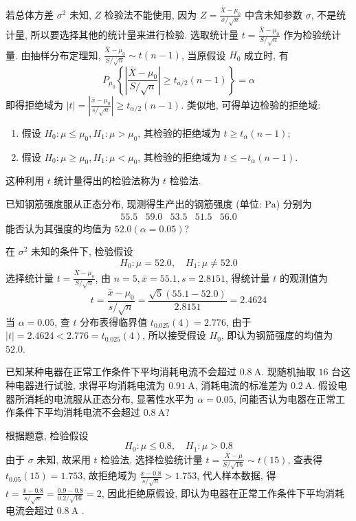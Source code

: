 若总体方差 $ \sigma^{2} $ 未知, $Z $ 检验法不能使用, 因为 $\displaystyle Z=\frac{\bar{X}-\mu_{0}}{\sigma / \sqrt{n}} $ 中含未知参数 $\sigma$, 不是统计量, 所以要选择其他的统计量来进行检验.
选取统计量 $\displaystyle t=\frac{\bar{X}-\mu_{0}}{S / \sqrt{n}} $ 作为检验统计量.
由抽样分布定理知, $\displaystyle\frac{\bar{X}-\mu_{0}}{S / \sqrt{n}} \sim t(n-1)$, 当原假设 $ H_{0} $ 成立时, 有
$$P_{\mu_{0}}\left\{\left|\frac{\bar{X}-\mu_{0}}{S / \sqrt{n}}\right| \geqslant t_{a / 2}(n-1)\right\}=\alpha$$
即得拒绝域为 $\displaystyle |t|=\left|\frac{\bar{x}-\mu_{0}}{s / \sqrt{n}}\right| \geqslant t_{\alpha / 2}(n-1)$.
类似地, 可得单边检验的拒绝域:
\begin{enumerate}[label=(\arabic{*})]
    \item 假设 $ H_{0}: \mu \leqslant \mu_{0}, H_{1}: \mu>\mu_{0}$, 其检验的拒绝域为 $ t \geqslant t_{\alpha}(n-1) $;
    \item 假设 $ H_{0}: \mu \geqslant \mu_{0}, H_{1}: \mu<\mu_{0}$, 其检验的拒绝域为 $ t \leqslant-t_{\alpha}(n-1) $.
\end{enumerate}
这种利用 $ t $ 统计量得出的检验法称为 $ t $ 检验法.

\begin{example}
    已知钢筋强度服从正态分布, 现测得生产出的钢筋强度 (单位: $ \mathrm{Pa} $) 分别为
    $$\begin{array}{lllll}
            55.5 & 59.0 & 53.5 & 51.5 & 56.0
        \end{array}$$
    能否认为其强度的均值为 $ 52.0(\alpha=0.05) $?
\end{example}
\begin{solution}
    在 $ \sigma^{2} $ 未知的条件下, 检验假设
    $$H_{0}: \mu=52.0, \quad H_{1}: \mu \neq 52.0$$
    选择统计量 $\displaystyle t=\frac{\bar{X}-\mu_{0}}{S / \sqrt{n}}$,
    由 $ n=5, \bar{x}=55.1, s=2.8151 $, 得统计量 $ t $ 的观测值为
    $$t=\frac{\bar{x}-\mu_{0}}{s / \sqrt{n}}=\frac{\sqrt{5}(55.1-52.0)}{2.8151}=2.4624$$
    当 $ \alpha=0.05 $, 查 $ t $ 分布表得临界值 $ t_{0.025}(4)=2.776 $, 由于 $ |t|=2.4624<2.776=t_{0.025}  (4)$, 所以接受假设 $ H_{0} $, 即认为钢笳强度的均值为 $ 52.0 $.
\end{solution}

\begin{example}
    已知某种电器在正常工作条件下平均消耗电流不会超过 $ 0.8 \mathrm{~A} $.
    现随机抽取 $16$ 台这种电器进行试验, 求得平均消耗电流为 $ 0.91 \mathrm{~A} $, 消耗电流的标准差为 $ 0.2 \mathrm{~A}$.
    假设电器所消耗的电流服从正态分布, 显著性水平为 $ \alpha=0.05$, 问能否认为电器在正常工作条件下平均消耗电流不会超过 $ 0.8 \mathrm{~A}$?
\end{example}
\begin{solution}
    根据题意, 检验假设
    $$H_{0}: \mu \leqslant 0.8, \quad H_{1}: \mu>0.8$$
    由于 $ \sigma $ 未知, 故采用 $ t $ 检验法, 选择检验统计量 $\displaystyle t=\frac{\bar{X}-\mu}{S / \sqrt{16}} \sim t(15) $,
    查表得 $ t_{0.05}(15)=  1.753$, 故拒绝域为 $\displaystyle \frac{\bar{x}-0.8}{s / \sqrt{n}}>1.753 $, 代人样本数据, 得 $\displaystyle t=\frac{\bar{x}-0.8}{s / \sqrt{n}}=\frac{0.9-0.8}{0.2 / \sqrt{16}}=2 $, 因此拒绝原假设, 即认为电器在正常工作条件下平均消耗电流会超过  $0.8 \mathrm{~A}$ .
\end{solution}

